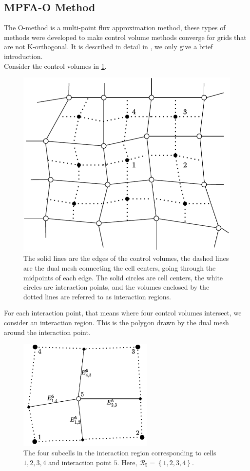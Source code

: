 \documentclass[../Main/main.tex]{subfiles}
\begin{document}
	\subsection{MPFA-O Method}

	The O-method is a multi-point flux approximation method, these types of methods were developed to make control volume methods converge for grids that are not K-orthogonal. It is described in detail in  \cite{Aavatsmark2002}, we only give a brief introduction.
	\\
	Consider the control volumes in \ref{fig:dualmesh}.
	\begin{figure}[H]
		\centering
		\includegraphics{dualmesh1.pdf}
		
		\caption{The solid lines are the edges of the control volumes, the dashed lines are the dual mesh connecting the cell centers, going through the midpoints of each edge. The solid circles are cell centers, the white circles are interaction points, and the volumes enclosed by the dotted lines are referred to as interaction regions.}
		\label{fig:dualmesh}
	\end{figure}
	For each interaction point, that means where four control volumes intersect, we consider an interaction region. This is the polygon drawn by the dual mesh around the interaction point.
	\begin{figure}[H]
		\centering
		\includegraphics[width=0.6\textwidth]{Interaction region.pdf}
		\caption{The four subcells in the interaction region corresponding to cells $1,2,3,4$ and interaction point $5$. Here, $\mathcal{R}_5 = \left \{1,2,3,4 \right\}$.}
		\label{fig:interactionregion}
	\end{figure}
\end{document}
